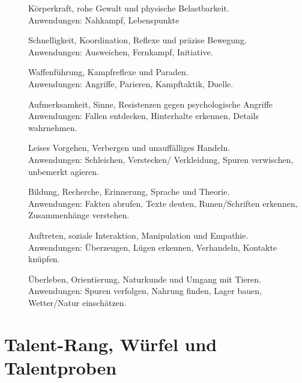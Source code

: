 \begin{description}
	\item[\textbf{ }] Körperkraft, rohe Gewalt und physische Belastbarkeit.\\
	Anwendungen: Nahkampf, Lebenspunkte
	
	\item[\textbf{ }] Schnelligkeit, Koordination, Reflexe und präzise Bewegung.\\
	Anwendungen: Ausweichen, Fernkampf, Initiative.
	
	\item[\textbf{ }] Waffenführung, Kampfreflexe und Paraden.\\
	Anwendungen: Angriffe, Parieren, Kampftaktik, Duelle.
	
	\item[\textbf{ }] Aufmerksamkeit, Sinne, Resistenzen gegen psychologische Angriffe\\
	Anwendungen: Fallen entdecken, Hinterhalte erkennen, Details wahrnehmen.
	
	\item[\textbf{ }] Leises Vorgehen, Verbergen und unauffälliges Handeln.\\
	Anwendungen: Schleichen, Verstecken/ Verkleidung, Spuren verwischen, unbemerkt agieren.
	
	\item[\textbf{ }] Bildung, Recherche, Erinnerung, Sprache und Theorie.\\
	Anwendungen: Fakten abrufen, Texte deuten, Runen/Schriften erkennen, Zusammenhänge verstehen.
	
	\item[\textbf{ }] Auftreten, soziale Interaktion, Manipulation und Empathie.\\
	Anwendungen: Überzeugen, Lügen erkennen, Verhandeln, Kontakte knüpfen.
	
	\item[\textbf{ }] Überleben, Orientierung, Naturkunde und Umgang mit Tieren.\\
	Anwendungen: Spuren verfolgen, Nahrung finden, Lager bauen, Wetter/Natur einschätzen.
\end{description}

\section{Talent-Rang, Würfel und Talentproben}

